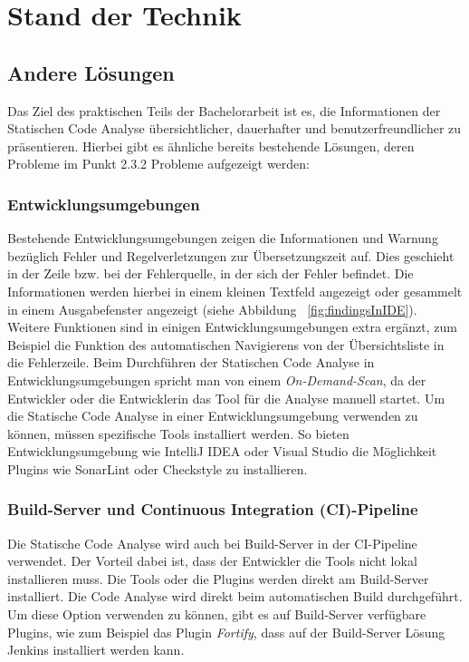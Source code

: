 
\chapter{Stand der Technik}
\section{Andere Lösungen}
Das Ziel des praktischen Teils der Bachelorarbeit ist es, die Informationen der Statischen Code Analyse übersichtlicher, dauerhafter und benutzerfreundlicher zu präsentieren. Hierbei gibt es ähnliche bereits bestehende Lösungen, deren Probleme im Punkt 2.3.2 Probleme aufgezeigt werden: 

\subsection{Entwicklungsumgebungen}
Bestehende Entwicklungsumgebungen zeigen die Informationen und Warnung bezüglich Fehler und Regelverletzungen zur Übersetzungszeit auf. Dies geschieht in der Zeile bzw. bei der Fehlerquelle, in der sich der Fehler befindet. Die Informationen werden hierbei in einem kleinen Textfeld angezeigt oder gesammelt in einem Ausgabefenster angezeigt  (siehe Abbildung ~\ref{fig:findingsInIDE}). Weitere Funktionen  sind in einigen Entwicklungsumgebungen extra ergänzt, zum Beispiel die Funktion des automatischen Navigierens von der Übersichtsliste in die Fehlerzeile. Beim Durchführen der Statischen Code Analyse in Entwicklungsumgebungen spricht man von einem \textit{On-Demand-Scan}, da der Entwickler oder die Entwicklerin das Tool für die Analyse manuell startet. Um die Statische Code Analyse in einer Entwicklungsumgebung verwenden zu können, müssen spezifische Tools installiert werden. So bieten Entwicklungsumgebung wie IntelliJ IDEA oder Visual Studio die Möglichkeit Plugins wie SonarLint oder Checkstyle zu installieren. ~\parencite{sonarLint}
\subsection{Build-Server und Continuous Integration (CI)-Pipeline}
Die Statische Code Analyse wird auch bei Build-Server in der CI-Pipeline verwendet. \parencite{zampetti2017open} Der Vorteil dabei ist, dass der Entwickler die Tools nicht lokal installieren muss. Die Tools oder die Plugins werden direkt am Build-Server installiert. Die Code Analyse wird direkt beim automatischen Build durchgeführt. Um diese Option verwenden zu können, gibt es auf Build-Server verfügbare Plugins, wie zum Beispiel das Plugin \textit{Fortify}, dass auf der Build-Server Lösung Jenkins installiert werden kann.
